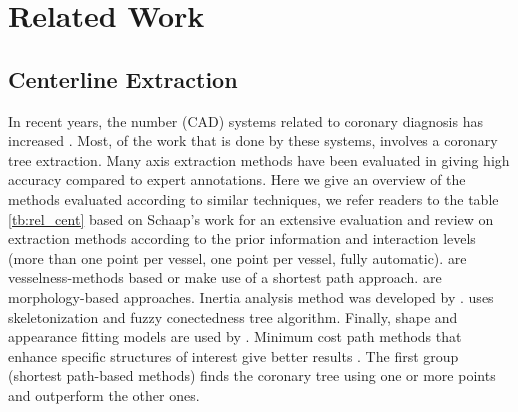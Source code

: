 \chapter{Related Work}\label{rel:rel}

\section{Centerline Extraction}

In recent years, the number (CAD) systems related to coronary diagnosis has increased \citep{Goldenberg2012}. Most, of the work that is done by these systems, involves a coronary tree extraction. Many axis extraction methods have been evaluated in \citep{Schaap2009} giving high accuracy compared to expert annotations. Here we give an overview of the methods evaluated according to similar techniques, we refer readers to the table \ref{tb:rel_cent} based on Schaap's work for an extensive evaluation and review on extraction methods according to the prior information and interaction levels (more than one point per vessel, one point per vessel, fully automatic).
\citep{Zhang2008, Tek2008, Metz2009, Krissian2008, Szymczak2008, Dikici2008, Friman2008} are vesselness-methods based or make use of a shortest path approach. \citep{Kitslaar2008, Castro2008} are morphology-based approaches. Inertia analysis method was developed by \citep{HernandezHoyos2008}. \citep{Wang2008} uses skeletonization and fuzzy conectedness tree algorithm . Finally, shape and appearance fitting models  are used by \citep{Zambal2008}.
Minimum cost path methods that enhance specific structures of interest give better results \citep{Schaap2009}. The first group (shortest path-based methods) finds the coronary tree using one or more points and outperform the other ones.

